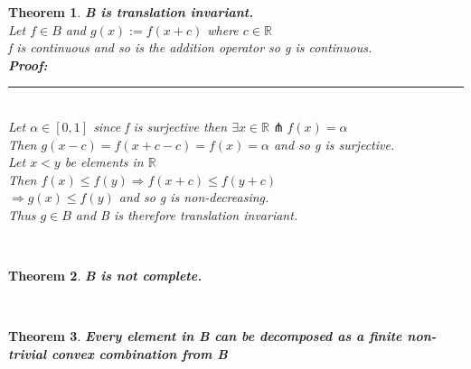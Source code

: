 \documentclass[12pt]{extarticle}
\theoremstyle{plain}
\newtheorem{thm}{Theorem}[section]
\theoremstyle{plain}
\theoremstyle{plain}
\theoremstyle{Definition}
\theoremstyle{Definition}
\theoremstyle{plain}
\newcommand{\cut}[0]{\noindent\framebox[\linewidth]{\rule{\linewidth}{2pt}}\\}
\newcommand{\prof}[0]{	\noindent \textbf{Proof:} \rule{500pt}{2pt} \\ }
\begin{document}
	\begin{thm} \textbf{B is translation invariant.} \\
			Let $f \in B$ and $g(x) := f(x+c)$ where $c \in \mathbb{R}$ \\
			f is continuous and so is the addition operator so g is continuous. \\
			\prof
			Let $\alpha \in [0,1]$ since f is surjective then $\exists x \in \mathbb{R} \pitchfork f(x) = \alpha$ \\ 
			Then $g(x-c) = f(x+c-c) = f(x) = \alpha$ and so g is surjective. \\ 
			Let $x < y$ be elements in $\mathbb{R}$ \\
			Then $f(x) \leq f(y) \Rightarrow f(x+c) \leq f(y+c)$ \\ 
			$\Rightarrow g(x) \leq f(y)$ and so g is non-decreasing. \\ 
			Thus $g \in B$ and B is therefore translation invariant. 
	\end{thm}
	\cut
	\begin{thm} \textbf{B is not complete.} \\
			
	\end{thm}
	\cut
	\begin{thm} \textbf{Every element in B can be decomposed as a finite non-trivial convex combination from B} \\
	
	\end{thm}
	\cut
	\newpage
\end{document}
